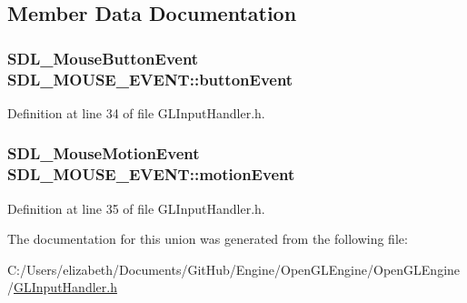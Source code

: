 \subsection{Member Data Documentation}
\subsubsection[{\texorpdfstring{button\+Event}{buttonEvent}}]{\setlength{\rightskip}{0pt plus 5cm}S\+D\+L\+\_\+\+Mouse\+Button\+Event S\+D\+L\+\_\+\+M\+O\+U\+S\+E\+\_\+\+E\+V\+E\+N\+T\+::button\+Event}\hypertarget{union_s_d_l___m_o_u_s_e___e_v_e_n_t_ad50a05e3e7614096226545a17674b21e}{}\label{union_s_d_l___m_o_u_s_e___e_v_e_n_t_ad50a05e3e7614096226545a17674b21e}


Definition at line 34 of file G\+L\+Input\+Handler.\+h.

\subsubsection[{\texorpdfstring{motion\+Event}{motionEvent}}]{\setlength{\rightskip}{0pt plus 5cm}S\+D\+L\+\_\+\+Mouse\+Motion\+Event S\+D\+L\+\_\+\+M\+O\+U\+S\+E\+\_\+\+E\+V\+E\+N\+T\+::motion\+Event}\hypertarget{union_s_d_l___m_o_u_s_e___e_v_e_n_t_af8459d7e4e5e53b2caf6e39db087f17c}{}\label{union_s_d_l___m_o_u_s_e___e_v_e_n_t_af8459d7e4e5e53b2caf6e39db087f17c}


Definition at line 35 of file G\+L\+Input\+Handler.\+h.



The documentation for this union was generated from the following file\+:\begin{DoxyCompactItemize}
\item 
C\+:/\+Users/elizabeth/\+Documents/\+Git\+Hub/\+Engine/\+Open\+G\+L\+Engine/\+Open\+G\+L\+Engine/\hyperlink{_g_l_input_handler_8h}{G\+L\+Input\+Handler.\+h}\end{DoxyCompactItemize}

